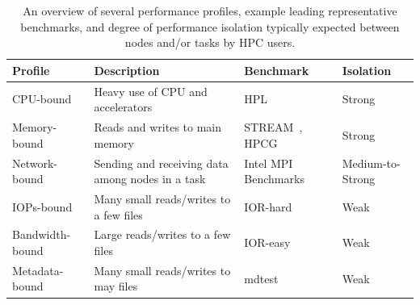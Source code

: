 \begin{table}
  \caption{An overview of several performance profiles, example leading representative benchmarks, and degree of performance isolation typically expected between nodes and/or tasks by HPC users.}
  \label{Table:profiles}
  \begin{center}
\begin{tabular}{|l|l|l|l|}
\hline
{\bf Profile} & {\bf Description} & {\bf Benchmark} & {\bf Isolation} \\
\hline
CPU-bound & Heavy use of CPU and accelerators & HPL~\cite{hpl} & Strong\\
\hline
Memory-bound & Reads and writes to main memory & \raggedright STREAM~\cite{stream}, HPCG~\cite{hpcg} & Strong\\
\hline
Network-bound & Sending and receiving data among nodes in a task & \raggedright Intel MPI Benchmarks~\cite{imb} & Medium-to-Strong\\
\hline
IOPs-bound & Many small reads/writes to a few files & IOR-hard~\cite{io500} & Weak\\
\hline
Bandwidth-bound & Large reads/writes to a few files & IOR-easy~\cite{io500} & Weak\\
\hline
Metadata-bound & Many small reads/writes to may files & mdtest~\cite{ior} & Weak \\
\hline
\end{tabular}
\end{center}
\end{table}



